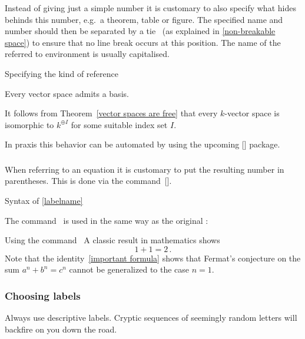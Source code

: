 Instead of giving just a simple number it is customary to also specify what hides behinds this number, e.g.\ a theorem, table or figure.
The specified name and number should then be separated by a tie~\inlinecode{\customtexttilde} (as explained in \cref{non-breakable space}) to ensure that no line break occurs at this position.
The name of the referred to environment is usually capitalised.
\begin{showlatex}[label = {hardcoding references}]{Specifying the kind of reference}
\begin{theorem}
  \label{every vector space has a basis}
  Every vector space admits a basis.
\end{theorem}
It follows from Theorem~\ref{vector spaces are free} that every $k$-vector space is isomorphic to $k^{\oplus I}$ for some suitable index set $I$.
\end{showlatex}
In praxis this behavior can be automated by using the upcoming [\packname] package.

\subsubsection{}

When referring to an equation it is customary to put the resulting number in parentheses.
This is done via the command~[\comname].
\begin{showcode}{Syntax of }
\eqref{labelname}
\end{showcode}
The command~ is used in the same way as the original :
\begin{showlatex}{Using the command~}
A classic result in mathematics shows
\begin{equation}
  \label{important formula}
  1 + 1 = 2 \,.
\end{equation}
Note that the identity~\eqref{important formula} shows that Fermat’s conjecture on the sum $a^n + b^n = c^n$ cannot be generalized to the case $n = 1$.
\end{showlatex}

\subsubsection{Choosing labels}

Always use descriptive labels.
Cryptic sequences of seemingly random letters will backfire on you down the road.



